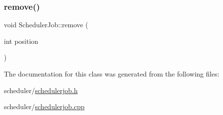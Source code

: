 \mbox{\label{class_scheduler_job_a1262432c4ea412a896669b6b24d5b121}} 
\subsubsection{\texorpdfstring{remove()}{remove()}}
{\footnotesize\ttfamily void Scheduler\+Job\+::remove (\begin{DoxyParamCaption}\item[{int}]{position }\end{DoxyParamCaption})}



The documentation for this class was generated from the following files\+:\begin{DoxyCompactItemize}
\item 
scheduler/\mbox{\hyperlink{schedulerjob_8h}{schedulerjob.\+h}}\item 
scheduler/\mbox{\hyperlink{schedulerjob_8cpp}{schedulerjob.\+cpp}}\end{DoxyCompactItemize}
